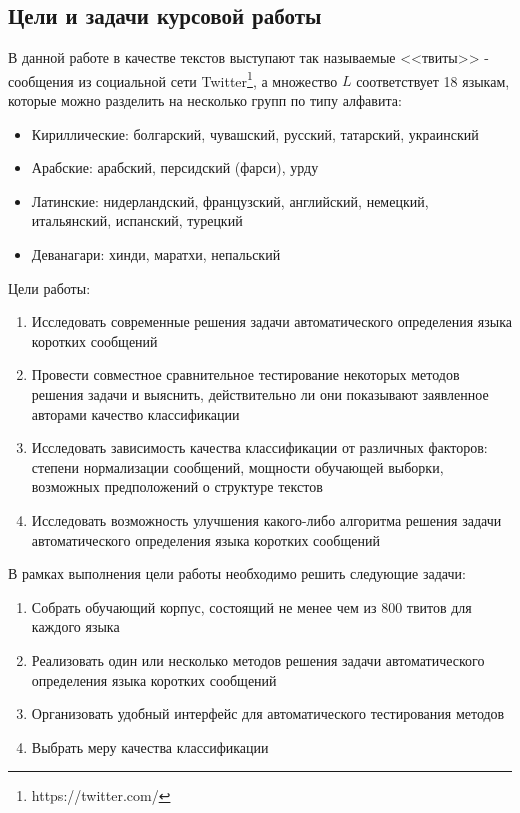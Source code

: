 \documentclass[a4paper, 14pt]{article}
\begin{document}
		\subsection{Цели и задачи курсовой работы}
		В данной работе в качестве текстов выступают так называемые <<твиты>> - сообщения из социальной сети Twitter\footnote{https://twitter.com/}, 
		а множество $L$ соответствует 18 языкам, которые можно разделить на несколько групп по типу алфавита:
		\begin{itemize}
			\item Кириллические: болгарский, чувашский, русский, татарский, украинский
			\item Арабские: арабский, персидский (фарси), урду
			\item Латинские: нидерландский, французский, английский, немецкий, итальянский, испанский, турецкий
			\item Деванагари: хинди, маратхи, непальский
		\end{itemize}
		Цели работы:
		\begin{enumerate}
			\item Исследовать современные решения задачи автоматического определения языка коротких сообщений
			\item Провести совместное сравнительное тестирование некоторых методов решения задачи и выяснить, действительно ли они показывают
			заявленное авторами качество классификации
			\item Исследовать зависимость качества классификации от различных факторов: степени нормализации сообщений, мощности обучающей 
			выборки, возможных предположений о структуре текстов
			\item Исследовать возможность улучшения какого-либо алгоритма решения задачи автоматического определения языка коротких сообщений	
		\end{enumerate}
		В рамках выполнения цели работы необходимо решить следующие задачи:
		\begin{enumerate}
			\item Собрать обучающий корпус, состоящий не менее чем из 800 твитов для каждого языка
			\item Реализовать один или несколько методов решения задачи автоматического определения языка коротких сообщений
			\item Организовать удобный интерфейс для автоматического тестирования методов
			\item Выбрать меру качества классификации
		\end{enumerate}
\end{document}

